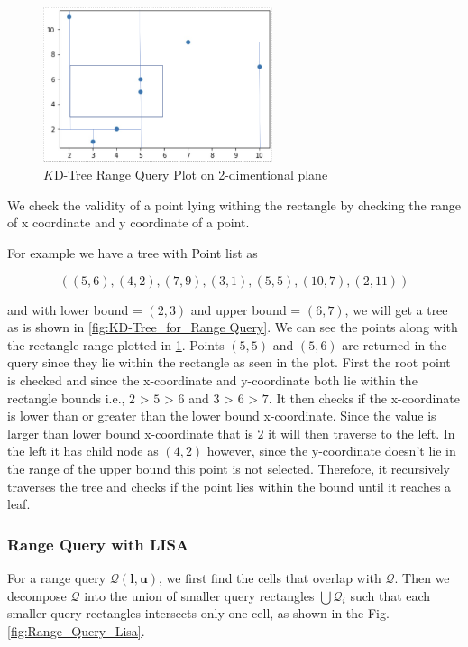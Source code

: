 \begin{figure}[htp]
    \centering
    \includegraphics[width=0.6\textwidth]{graphs/Range_Query_plot.png}
    \caption{$K$D-Tree Range Query Plot on 2-dimentional plane}
    \label{fig:KD_Tree_Range_Query_Plot}
\end{figure}


We check the validity of a point lying withing the rectangle by checking the range of x coordinate and y coordinate of a point.

\begin{mscexample}
    For example we have a tree with Point list as 

	$$((5,6),(4,2),(7,9),(3,1),(5,5),(10,7),(2,11))$$
	
	and with lower bound = $(2,3)$ and upper bound = $(6,7)$, we will get a tree as is shown in \ref{fig:KD-Tree_for_Range Query}. We can see the points along with the rectangle range plotted in \ref{fig:KD_Tree_Range_Query_Plot}. Points $(5,5)$ and $(5,6)$ are returned in the query since they lie within the rectangle as seen in the plot. First the root point is checked and since the x-coordinate and y-coordinate both lie within the rectangle bounds i.e., $2$ > $5$ > $6$ and $3$ > $6$ > $7$. It then checks if the x-coordinate is lower than or greater than the lower bound x-coordinate. Since the value is larger than lower bound x-coordinate that is $2$ it will then traverse to the left. In the left it has child node as $(4,2)$ however, since the y-coordinate doesn't lie in the range of the upper bound this point is not selected. Therefore, it recursively traverses the tree and checks if the point lies within the bound until it reaches a leaf.
\end{mscexample}

\subsubsection{Range Query with LISA}

For a range query $\mathcal{Q}(\boldsymbol{l},\boldsymbol{u})$, we first find the cells that overlap with $\mathcal{Q}$. Then we decompose $\mathcal{Q}$ into the union of smaller query rectangles $\bigcup \mathcal{Q}_i$ such that each smaller query rectangles intersects only one cell, as shown in the Fig. \ref{fig:Range_Query_Lisa}.

